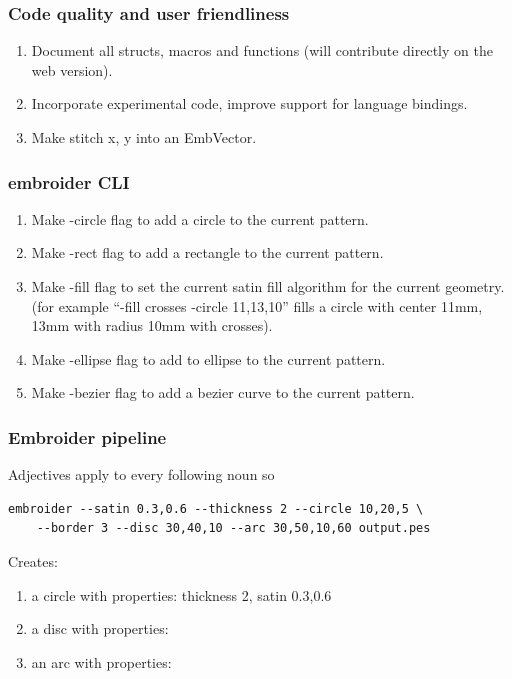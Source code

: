 \documentclass[a4paper, 11pt]{report}
\begin{document}
\subsubsection{Code quality and user friendliness}

\begin{enumerate}
\item Document all structs, macros and functions (will contribute directly
   on the web version).
\item Incorporate experimental code, improve support for language bindings.
\item Make stitch x, y into an EmbVector.
\end{enumerate}

\subsubsection{embroider CLI}

\begin{enumerate}
\item Make -circle flag to add a circle to the current pattern.
\item Make -rect flag to add a rectangle to the current pattern.
\item Make -fill flag to set the current satin fill algorithm for the current geometry. (for example ``-fill crosses -circle 11,13,10'' fills a circle with center 11mm, 13mm with radius 10mm with crosses).
\item Make -ellipse flag to add to ellipse to the current pattern.
\item Make -bezier flag to add a bezier curve to the current pattern.
\end{enumerate}

\subsubsection{Embroider pipeline}

Adjectives apply to every following noun so

\begin{verbatim}
embroider --satin 0.3,0.6 --thickness 2 --circle 10,20,5 \
    --border 3 --disc 30,40,10 --arc 30,50,10,60 output.pes
\end{verbatim}

Creates:

\begin{enumerate}
\item a circle with properties: thickness 2, satin 0.3,0.6
\item a disc with properties: 
\item an arc with properties:
\end{enumerate}
\end{document}
